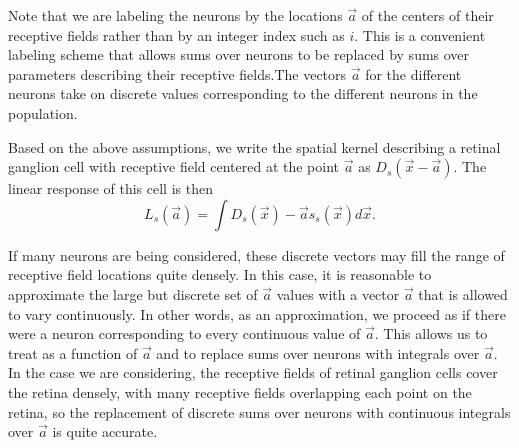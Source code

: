 \begin{ntn}
  Note that we are labeling the neurons by the locations $\vec{a}$ of the centers of
their receptive fields rather than by an integer index such as $i$. This is a
convenient labeling scheme that allows sums over neurons to be replaced
by sums over parameters describing their receptive fields.The vectors
$\vec{a}$ for the different neurons take on discrete values corresponding to the
different neurons in the population.
\end{ntn}
\begin{prop}
  Based on the above assumptions, we write the spatial kernel describing a retinal ganglion cell with receptive
field centered at the point $\vec{a}$ as $D_s(\vec{x}-\vec{a})$. The linear response of this cell is
then
\begin{equation}
  \label{equ:4.35}
  L_s(\vec{a})=\int{D_s(\vec{x})-\vec{a}s_s(\vec{x})d\vec{x}}.
\end{equation}
\end{prop}

\begin{rem}
  If many neurons are being considered,
these discrete vectors may fill the range of receptive field locations quite
densely. In this case, it is reasonable to approximate the large but
discrete set of $\vec{a}$ values with a vector $\vec{a}$ that is
allowed to vary continuously. In
other words, as an approximation, we proceed as if there were a neuron
corresponding to every continuous value of $\vec{a}$. This allows us
to treat as a function of $\vec{a}$ and to replace sums over neurons
with integrals over $\vec{a}$. In the case we are considering, the receptive fields of retinal ganglion
cells cover the retina densely, with many receptive fields overlapping each
point on the retina, so the replacement of discrete sums over neurons with
continuous integrals over $\vec{a}$ is quite accurate.
\end{rem}


